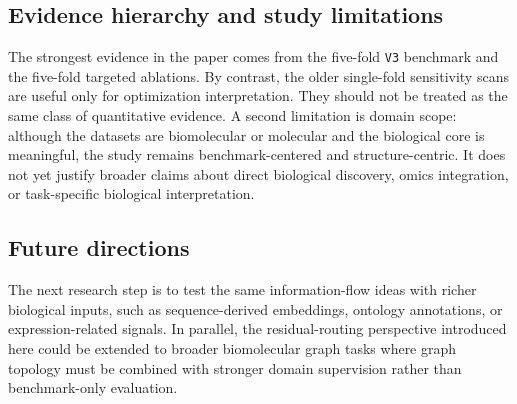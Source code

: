 \subsection*{Evidence hierarchy and study limitations}

The strongest evidence in the paper comes from the five-fold \texttt{V3} benchmark and the five-fold targeted ablations. By contrast, the older single-fold sensitivity scans are useful only for optimization interpretation. They should not be treated as the same class of quantitative evidence. A second limitation is domain scope: although the datasets are biomolecular or molecular and the biological core is meaningful, the study remains benchmark-centered and structure-centric. It does not yet justify broader claims about direct biological discovery, omics integration, or task-specific biological interpretation.

\subsection*{Future directions}

The next research step is to test the same information-flow ideas with richer biological inputs, such as sequence-derived embeddings, ontology annotations, or expression-related signals. In parallel, the residual-routing perspective introduced here could be extended to broader biomolecular graph tasks where graph topology must be combined with stronger domain supervision rather than benchmark-only evaluation.
